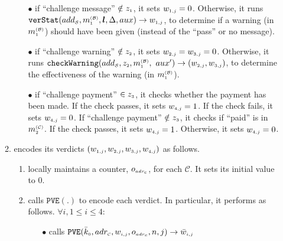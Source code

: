 \begin{enumerate}
\begin{enumerate}
\begin{itemize}
%
\item[$\bullet$]  if  ``challenge message'' $\notin z_{\scriptscriptstyle 1}$, it sets $w_{\scriptscriptstyle 1,j}= 0$. Otherwise,  it runs $\mathtt{verStat}(add_{\scriptscriptstyle\mathcal{S}}, m_{\scriptscriptstyle 1}^{\scriptscriptstyle(\mathcal{B})},  \bm{l}, \Delta, {aux})\rightarrow w_{\scriptscriptstyle 1, j}$, to determine if a warning (in $m_{\scriptscriptstyle 1}^{\scriptscriptstyle(\mathcal{B})}$) should have been given (instead of the ``pass'' or no message). %
%
\item[$\bullet$]  if ``challenge warning'' $\notin z_{\scriptscriptstyle 2}$, it sets $w_{\scriptscriptstyle 2, j}= w_{\scriptscriptstyle 3, j}= 0$. Otherwise, it runs $\mathtt{checkWarning}(add_{\scriptscriptstyle\mathcal{S}}, z_{\scriptscriptstyle 2}, m_{\scriptscriptstyle 1}^{\scriptscriptstyle(\mathcal{B})},$ $  {aux}')\rightarrow (w_{\scriptscriptstyle 2, j}, w_{\scriptscriptstyle 3, j})$, to determine the effectiveness of the warning (in $m_{\scriptscriptstyle 1}^{\scriptscriptstyle(\mathcal{B})}$). %



\item[$\bullet$]  if ``challenge payment'' $\in z_{\scriptscriptstyle 3}$, it checks whether the  payment has been  made.   If the check passes, it sets  $w_{\scriptscriptstyle 4, j}=1$. If the check fails,   it sets $w_{\scriptscriptstyle 4, j}=0$.  If ``challenge payment'' $\notin z_{\scriptscriptstyle 3}$, it checks if  ``paid'' is in ${m}_{\scriptscriptstyle 2}^{\scriptscriptstyle(\mathcal C)}$. If the check passes, it sets $w_{\scriptscriptstyle 4, j}=1$. Otherwise, it sets $w_{\scriptscriptstyle 4, j}=0$. 
%
\end{itemize}
%
\item  encodes  its verdicts $(w_{\scriptscriptstyle 1, j}, w_{\scriptscriptstyle 2, j}, w_{\scriptscriptstyle 3, j},  w_{\scriptscriptstyle 4, j})$ as follows. 
%
\begin{enumerate}
%
\item locally maintains a counter, $o_{\scriptscriptstyle adr_{\scriptscriptstyle{c}}}$,  for each $\mathcal{C}$. It sets its initial value to $0$.
%


\item calls $\mathtt{PVE}(.)$ to encode each verdict. In particular, it performs as follows. $\forall i, 1\leq i \leq 4:$
\begin{enumerate}
%

\item[$\bullet$] calls $\mathtt{PVE}(\bar{k}_{\scriptscriptstyle 0}, adr_{\scriptscriptstyle\mathcal{C}},  w_{\scriptscriptstyle i, j}, o_{\scriptscriptstyle adr_{\scriptscriptstyle{c}}}, n,  j)\rightarrow  \bar{  w}_{\scriptscriptstyle i,j}$


\end{enumerate}
\end{enumerate}
\end{enumerate}
\end{enumerate}

